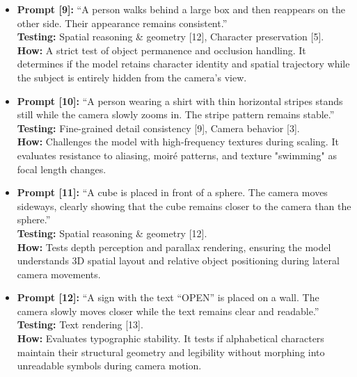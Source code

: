 \documentclass[sigconf]{acmart}
\begin{document}
\begin{itemize}
    \item \textbf{Prompt [9]:} ``A person walks behind a large box and then reappears on the other side. Their appearance remains consistent.''
          \\ \textbf{Testing:} Spatial reasoning \& geometry [12], Character preservation [5].
          \\ \textbf{How:} A strict test of object permanence and occlusion handling. It determines if the model retains character identity and spatial trajectory while the subject is entirely hidden from the camera's view.

    \item \textbf{Prompt [10]:} ``A person wearing a shirt with thin horizontal stripes stands still while the camera slowly zooms in. The stripe pattern remains stable.''
          \\ \textbf{Testing:} Fine-grained detail consistency [9], Camera behavior [3].
          \\ \textbf{How:} Challenges the model with high-frequency textures during scaling. It evaluates resistance to aliasing, moir\'e patterns, and texture "swimming" as focal length changes.



    \item \textbf{Prompt [11]:} ``A cube is placed in front of a sphere. The camera moves sideways, clearly showing that the cube remains closer to the camera than the sphere.''
          \\ \textbf{Testing:} Spatial reasoning \& geometry [12].
          \\ \textbf{How:} Tests depth perception and parallax rendering, ensuring the model understands 3D spatial layout and relative object positioning during lateral camera movements.

    \item \textbf{Prompt [12]:} ``A sign with the text ``OPEN'' is placed on a wall. The camera slowly moves closer while the text remains clear and readable.''
          \\ \textbf{Testing:} Text rendering [13].
          \\ \textbf{How:} Evaluates typographic stability. It tests if alphabetical characters maintain their structural geometry and legibility without morphing into unreadable symbols during camera motion.
\end{itemize}
\end{document}
